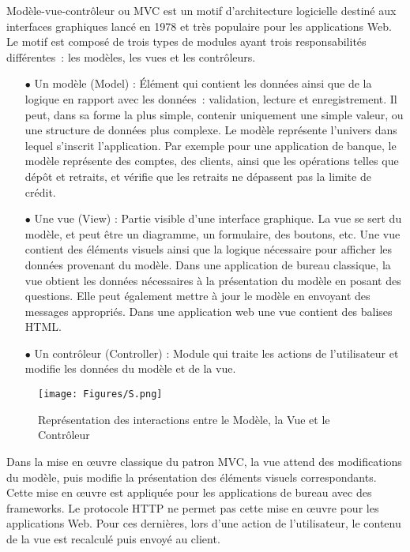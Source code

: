 Modèle-vue-contrôleur ou MVC est un motif d'architecture logicielle destiné aux interfaces graphiques lancé en 1978 et très populaire pour les applications Web. Le motif est composé de trois types de modules ayant trois responsabilités différentes : les modèles, les vues et les contrôleurs.
\vspace{.3cm}
\begin{itemize}
    \item[$\bullet$] Un modèle (Model) : Élément qui contient les données ainsi que de la logique en rapport avec les données : validation, lecture et enregistrement. Il peut, dans sa forme la plus simple, contenir uniquement une simple valeur, ou une structure de données plus complexe. Le modèle représente l'univers dans lequel s'inscrit l'application. Par exemple pour une application de banque, le modèle représente des comptes, des clients, ainsi que les opérations telles que dépôt et retraits, et vérifie que les retraits ne dépassent pas la limite de crédit.
    
    \item[$\bullet$] Une vue (View) : Partie visible d'une interface graphique. La vue se sert du modèle, et peut être un diagramme, un formulaire, des boutons, etc. Une vue contient des éléments visuels ainsi que la logique nécessaire pour afficher les données provenant du modèle. Dans une application de bureau classique, la vue obtient les données nécessaires à la présentation du modèle en posant des questions. Elle peut également mettre à jour le modèle en envoyant des messages appropriés. Dans une application web une vue contient des balises HTML.
    
    \item[$\bullet$] Un contrôleur (Controller) : Module qui traite les actions de l'utilisateur et modifie les données du modèle et de la vue.
\end{itemize}
\vspace{.3cm}

\begin{figure}[H]
    \centering
    \texttt{[image: Figures/S.png]}
    \caption{Représentation des interactions entre le Modèle, la Vue et le Contrôleur}
\end{figure}

\vspace{.3cm}
Dans la mise en œuvre classique du patron MVC, la vue attend des modifications du modèle, puis modifie la présentation des éléments visuels correspondants. Cette mise en œuvre est appliquée pour les applications de bureau avec des frameworks. Le protocole HTTP ne permet pas cette mise en œuvre pour les applications Web. Pour ces dernières, lors d'une action de l'utilisateur, le contenu de la vue est recalculé puis envoyé au client. 

